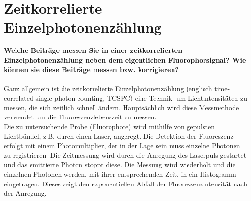 \section{Zeitkorrelierte Einzelphotonenzählung}
\textbf{Welche Beiträge messen Sie in einer zeitkorrelierten Einzelphotonenzählung 
neben dem eigentlichen Fluorophorsignal? Wie können sie diese Beiträge messen 
bzw. korrigieren?}\\\\
Ganz allgemein ist die zeitkorrelierte Einzelphotonenzählung 
(englisch time-correlated single photon counting, TCSPC) eine Technik, um Lichtintensitäten zu messen,
die sich zeitlich schnell ändern. Hauptsächlich wird diese Messmethode verwendet um 
die Fluoreszenzlebenszeit zu messen.\\
Die zu untersuchende Probe (Fluorophore) wird mithilfe 
von gepulsten Lichtbündel, z.B. durch
einen Laser, angeregt.
Die Detektion der Fluoreszenz erfolgt mit einem 
Photomultiplier, der in der Lage 
sein muss einzelne Photonen zu registrieren.
Die Zeitmessung wird durch die Anregung des Laserpuls gestartet und das 
emittierte Photon stoppt diese. 
Die Messung wird wiederholt und die einzelnen 
Photonen werden, mit ihrer entsprechenden Zeit, in ein Histogramm eingetragen.
Dieses zeigt den exponentiellen Abfall der Fluoreszenzintensität 
nach der Anregung. \citep[vgl.][]{photonenzaehlung}\\

